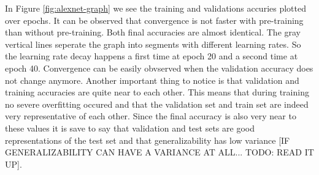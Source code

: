 \begin{table}[h] \centering
{}
\caption{Hyper parameters for Alexnet optimized with SigOpt and without pre-training}
\label{tbl:AlexNetBaseline}
\end{table}

\begin{table}[h] \centering
{}
\caption{Hyper parameters for Alexnet optimized with SigOpt and without pre-training}
\label{tbl:AlexNetMultiRun}
\end{table}

In Figure \ref{fig:alexnet-graph} we see the training and validations accuries plotted over epochs. It can be observed that convergence is not faster with pre-training than without pre-training. Both final accuracies are almost identical. The gray vertical lines seperate the graph into segments with different learning rates. So the learning rate decay happens a first time at epoch 20 and a second time at epoch 40. Convergence can be easily obvserved when the validation accuracy does not change anymore. Another important thing to notice is that validation and training accuracies are quite near to each other. This means that during training no severe overfitting occured and that the validation set and train set are indeed very representative of each other. Since the final accuracy is also very near to these values it is save to say that validation and test sets are good representations of the test set and that generalizability has low variance [IF GENERALIZABILITY CAN HAVE A VARIANCE AT ALL... TODO: READ IT UP].

